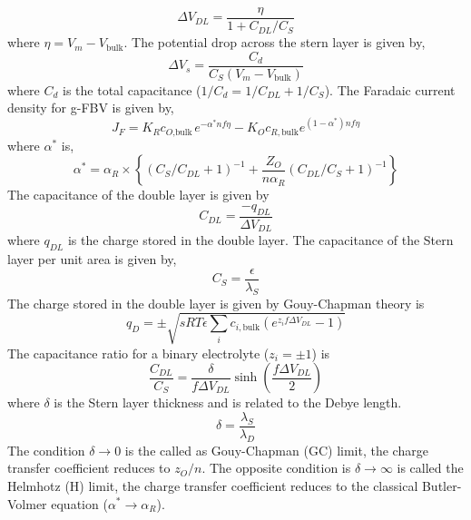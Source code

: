 \documentclass[12pt]{book}
\begin{document}
\begin{equation}
\Delta V_{DL}= \frac{\eta}{1 + C_{DL}/C_S}
\end{equation}
where $\eta = V_m - V_\textrm{bulk}$. The potential drop across the stern layer is given by,
\begin{equation}
\Delta V_s = \frac{C_d}{C_S\left(V_m - V_\textrm{bulk}\right)}
\end{equation}
where $C_d$ is the total capacitance ($1/C_d = 1/C_{DL} + 1/C_S$).
The Faradaic current density for g-FBV is given by,
\begin{equation}
J_F = K_R c_{O{,\textrm{bulk}}}e^{-\alpha^* nf\eta} - K_Oc_{R,\textrm{bulk}}e^{\left(1-\alpha^*\right) nf\eta}
\end{equation}
where $\alpha^*$ is,
\begin{equation}
\alpha^* = \alpha_R \times \left\{\left(C_S/C_{DL} + 1\right)^{-1} + \frac{Z_O}{n\alpha_R}\left(C_{DL}/C_S + 1\right)^{-1} \right\}
\end{equation}
The capacitance of the double layer is given by 
\begin{equation}
C_{DL} = \frac{-q_{DL}}{\Delta V_{DL}}
\end{equation}
where $q_{DL}$ is the charge stored in the double layer.  The capacitance of the Stern layer per unit area is given by,
\begin{equation}
C_S = \frac{\epsilon}{\lambda_S}
\end{equation}
The charge stored in the double layer is given by Gouy-Chapman theory is
\begin{equation}
q_D = \pm \sqrt{sRT\epsilon\sum_i c_{i,\textrm{bulk}}\left(e^{z_i f\Delta V_{DL}} -1\right)}
\end{equation}
The capacitance ratio for a binary electrolyte ($z_i = \pm 1$) is 
\begin{equation}
\frac{C_{DL}}{C_S} = \frac{\delta}{f\Delta V_{DL}}\sinh{\left(\frac{f\Delta V_{DL}}{2}\right)}
\end{equation}
where $\delta$ is the Stern layer thickness and is related to the Debye length. 
\begin{equation}
\delta = \frac{\lambda_S}{\lambda_D}
\end{equation}
The condition $\delta \rightarrow 0$ is the called as Gouy-Chapman (GC) limit, the charge transfer coefficient reduces to $z_O/n$. The opposite condition is $\delta \rightarrow \infty$ is called the Helmhotz (H) limit, the charge transfer coefficient reduces to the classical Butler-Volmer equation ($\alpha^*\rightarrow \alpha_R$).
 
\end{document}
